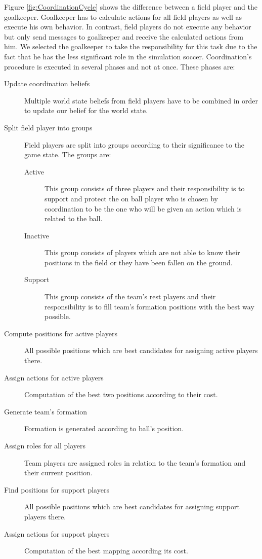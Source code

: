 Figure \ref{fig:CoordinationCycle} shows the difference between a field player and the goalkeeper. Goalkeeper has to calculate actions for all field players as well as execute his own behavior. In contrast, field players do not execute any behavior but only send messages to goalkeeper and receive the calculated actions from him. We selected the goalkeeper to take the responsibility for this task due to the fact that he has the less significant role in the simulation soccer. Coordination's procedure is executed in several phases and not at once. These phases are:
\begin{description}
\item[Update coordination beliefs] Multiple world state beliefs from field players have to be combined in order to update our belief for the world state.
\item[Split field player into groups] Field players are split into groups according to their significance to the game state. The groups are:
\begin{description}
\item[Active] This group consists of three players and their responsibility is to support and protect the on ball player who is chosen by coordination to be the one who will be given an action which is related to the ball.
\item[Inactive] This group consists of players which are not able to know their positions in the field or they have been fallen on the ground.
\item[Support] This group consists of the team's rest players and their responsibility is to fill team's formation positions with the best way possible.
\end{description}
\item[Compute positions for active players] All possible positions which are best candidates for assigning active players there.
\item[Assign actions for active players] Computation of the best two positions according to their cost.
\item[Generate team's formation] Formation is generated according to ball's position.
\item[Assign roles for all players] Team players are assigned roles in relation to the team's formation and their current position.
\item[Find positions for support players] All possible positions which are best candidates for assigning support players there.
\item[Assign actions for support players] Computation of the best mapping  according its cost.
\end{description}


